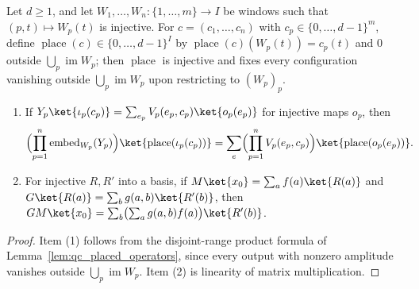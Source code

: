 \begin{lemma}
    \label{lem:qc_placed_configurations}
    \leanok
    Let $d\ge1$, and let $W_1,\dots,W_n\colon\{1,\dots,m\}\to I$ be windows such that $(p,t)\mapsto W_p(t)$ is injective. For $c=(c_1,\dots,c_n)$ with $c_p\in\{0,\dots,d-1\}^m$, define $\operatorname{place}(c)\in\{0,\dots,d-1\}^I$ by $\operatorname{place}(c)(W_p(t))=c_p(t)$ and $0$ outside $\bigcup_p\operatorname{im}W_p$; then $\operatorname{place}$ is injective and fixes every configuration vanishing outside $\bigcup_p\operatorname{im}W_p$ upon restricting to $(W_p)_p$.
    \begin{enumerate}
        \item If $Y_p\ket{\iota_p(c_p)}=\sum_{e_p}V_p(e_p,c_p)\ket{o_p(e_p)}$ for injective maps $o_p$, then
              \begin{align}
                  \Bigl(\prod_{p=1}^n\operatorname{embed}_{W_p}(Y_p)\Bigr)\ket{\operatorname{place}(\iota_p(c_p))}
                   & =\sum_{e}\Bigl(\prod_{p=1}^n V_p(e_p,c_p)\Bigr)\ket{\operatorname{place}(o_p(e_p))}.\notag
              \end{align}
        \item For injective $R,R'$ into a basis, if $M\ket{x_0}=\sum_a f(a)\ket{R(a)}$ and $G\ket{R(a)}=\sum_b g(a,b)\ket{R'(b)}$, then $GM\ket{x_0}=\sum_b\bigl(\sum_a g(a,b)f(a)\bigr)\ket{R'(b)}$.
    \end{enumerate}
\end{lemma}
\begin{proof}
    \leanok
    Item (1) follows from the disjoint-range product formula of Lemma~\ref{lem:qc_placed_operators}, since every output with nonzero amplitude vanishes outside $\bigcup_p\operatorname{im}W_p$. Item (2) is linearity of matrix multiplication.
\end{proof}

